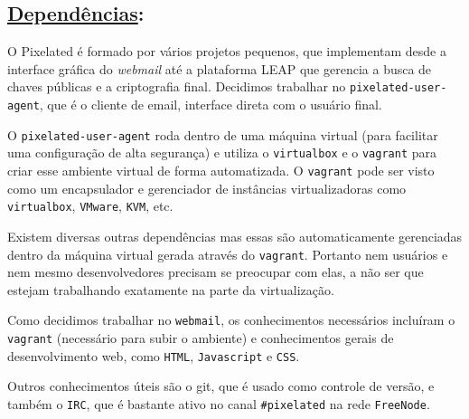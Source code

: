 \subsection*{\underline{Dependências}:}

O Pixelated é formado por vários projetos pequenos, que implementam desde a
interface gráfica do \emph{webmail} até a plataforma LEAP que gerencia a busca de
chaves públicas e a criptografia final. Decidimos trabalhar no
\texttt{pixelated-user-agent}, que é o cliente de email, interface direta com o
usuário final.

O \texttt{pixelated-user-agent} roda dentro de uma máquina virtual (para facilitar
uma configuração de alta segurança) e utiliza o \texttt{virtualbox} e o
\texttt{vagrant} para criar esse ambiente virtual de forma automatizada.
O \texttt{vagrant} pode ser visto como um encapsulador e gerenciador de
instâncias virtualizadoras como \texttt{virtualbox}, \texttt{VMware},
\texttt{KVM}, etc.

Existem diversas outras dependências mas essas são automaticamente gerenciadas
dentro da máquina virtual gerada através do \texttt{vagrant}. Portanto nem
usuários e nem
mesmo desenvolvedores precisam se preocupar com elas, a não ser que estejam
trabalhando exatamente na parte da virtualização.

Como decidimos trabalhar no \texttt{webmail}, os conhecimentos necessários
incluíram o \texttt{vagrant} (necessário para subir o ambiente) e conhecimentos
gerais de
desenvolvimento web, como \texttt{HTML}, \texttt{Javascript} e \texttt{CSS}.

Outros conhecimentos úteis são o git, que é usado como controle de versão,
e também o \texttt{IRC}, que é bastante ativo no canal \texttt{\#pixelated} na rede
\texttt{FreeNode}.